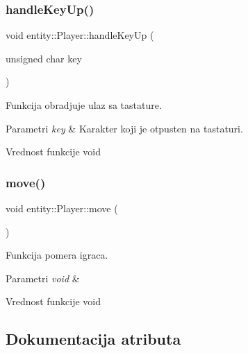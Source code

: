 \subsubsection{\texorpdfstring{handle\+Key\+Up()}{handleKeyUp()}}
{\footnotesize\ttfamily void entity\+::\+Player\+::handle\+Key\+Up (\begin{DoxyParamCaption}\item[{unsigned char}]{key }\end{DoxyParamCaption})}



Funkcija obradjuje ulaz sa tastature. 


\begin{DoxyParams}{Parametri}
{\em key} & Karakter koji je otpusten na tastaturi. \\
\hline
\end{DoxyParams}
\begin{DoxyReturn}{Vrednost funkcije}
void 
\end{DoxyReturn}
\mbox{\label{classentity_1_1Player_a9b0a7ab96a4ba7c24c7ddac8f07c4d5e}} 
\subsubsection{\texorpdfstring{move()}{move()}}
{\footnotesize\ttfamily void entity\+::\+Player\+::move (\begin{DoxyParamCaption}{ }\end{DoxyParamCaption})}



Funkcija pomera igraca. 


\begin{DoxyParams}{Parametri}
{\em void} & \\
\hline
\end{DoxyParams}
\begin{DoxyReturn}{Vrednost funkcije}
void 
\end{DoxyReturn}


\subsection{Dokumentacija atributa}
\mbox{\label{classentity_1_1Player_a92fb9b7321096cd6dedbcc31b12cf011}} 
